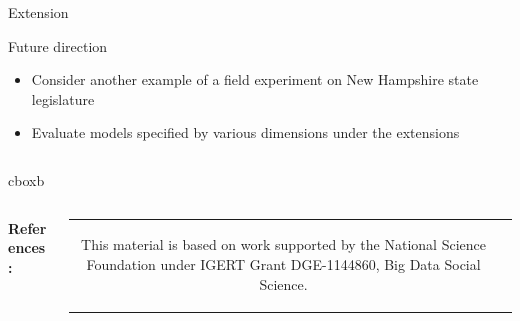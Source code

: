 \documentclass[final]{beamer}
\newlength{\onecolwid}
\newlength{\onecolwidd}
\begin{document}
\begin{frame}[t]
\begin{columns}[t]
\begin{column}{\onecolwidd}
\begin{block}{Extension}
\begin{rmfamily}
	\end{rmfamily}						
	\end{block}
	
	\vspace*{10mm}
	\begin{block}{Future direction}
	\begin{rmfamily}
	
	\begin{itemize}
	\item Consider another example of a field experiment on New Hampshire state legislature
	\vspace*{.1in}
	\item Evaluate models specified by various dimensions under the extensions
	\vspace*{.1in}
	\end{itemize}
		
	\end{rmfamily}						
	\end{block}

	\end{column}	
	\end{columns}
	
	

	\vspace{1.5in} %
	\hspace*{.025in} \begin{beamercolorbox}[wd=50.75in,colsep=0.1cm]{cboxb}\end{beamercolorbox}
	\vspace{0.25in}
			
	\begin{columns}
		\vspace{0.3in}
		\begin{column}{0.3\paperwidth}	
			\begin{rmfamily}
				\small
					\vspace{0.1in}
				\textbf{References:} \\

	
			\end{rmfamily}
			
			\vspace{0.5in}		
		\end{column}
		
		
		\begin{column}{0.3\paperwidth}
	\centering
		\begin{tabular}{cc}

 \begin{minipage}{8.5in}
 \begin{rmfamily}
This material is based on work supported by the National Science Foundation under IGERT Grant DGE-1144860, Big Data Social Science.
\end{rmfamily}


\end{minipage}
\end{tabular}
\end{column}
\end{columns}
\end{frame}
\end{document}
